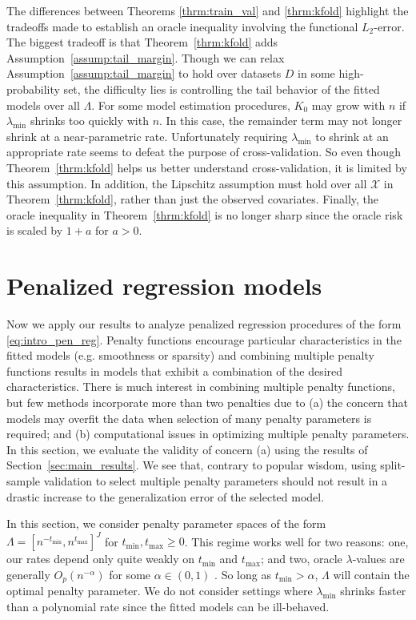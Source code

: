 \documentclass[12pt]{article} %
\theoremstyle{definition}
\begin{document}
The differences between Theorems \ref{thrm:train_val} and \ref{thrm:kfold} highlight the tradeoffs made to establish an oracle inequality involving the functional $L_2$-error.
The biggest tradeoff is that Theorem~\ref{thrm:kfold} adds Assumption~\ref{assump:tail_margin}.
Though we can relax Assumption~\ref{assump:tail_margin} to hold over datasets $D$ in some high-probability set, the difficulty lies is controlling the tail behavior of the fitted models over all $\Lambda$.
For some model estimation procedures, $K_0$ may grow with $n$ if $\lambda_{\min}$ shrinks too quickly with $n$.
In this case, the remainder term may not longer shrink at a near-parametric rate.
Unfortunately requiring $\lambda_{\min}$ to shrink at an appropriate rate seems to defeat the purpose of cross-validation.
So even though Theorem~\ref{thrm:kfold} helps us better understand cross-validation, it is limited by this assumption.
In addition, the Lipschitz assumption must hold over all $\mathcal{X}$ in Theorem~\ref{thrm:kfold}, rather than just the observed covariates.
Finally, the oracle inequality in Theorem~\ref{thrm:kfold} is no longer sharp since the oracle risk is scaled by $1+a$ for $a > 0$.

\section{Penalized regression models}
\label{sec:examples}
Now we apply our results to analyze penalized regression procedures of the form \eqref{eq:intro_pen_reg}.
Penalty functions encourage particular characteristics in the fitted models (e.g. smoothness or sparsity) and combining multiple penalty functions results in models that exhibit a combination of the desired characteristics. 
There is much interest in combining multiple penalty functions, but few methods incorporate more than two penalties due to (a) the concern that models may overfit the data when selection of many penalty parameters is required; and (b) computational issues in optimizing multiple penalty parameters. In this section, we evaluate the validity of concern (a) using the results of Section~\ref{sec:main_results}. We see that, contrary to popular wisdom, using split-sample validation to select multiple penalty parameters should not result in a drastic increase to the generalization error of the selected model.

In this section, we consider penalty parameter spaces of the form
$\Lambda = [ n^{-t_{\min}}, n^{t_{\max}}]^J$
for $t_{\min}, t_{\max} \ge 0$.
This regime works well for two reasons: one, our rates depend only quite weakly on $t_{\min}$ and $t_{\max}$; and two, oracle $\lambda$-values are generally $O_p(n^{-\alpha})$ for some $\alpha \in (0,1)$ \citep{van2000empirical, van2014additive, buhlmann2011statistics}. So long as $t_{\min} > \alpha$, $\Lambda$ will contain the optimal penalty parameter.
We do not consider settings where $\lambda_{\min}$ shrinks faster than a polynomial rate since the fitted models can be ill-behaved.
\end{document}
